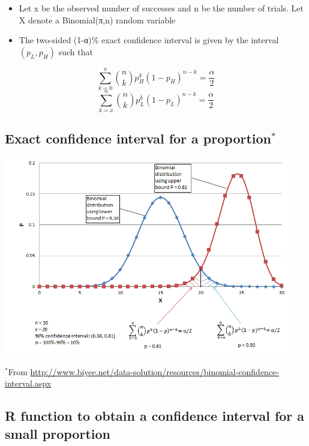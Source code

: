 \documentclass[
]{book}
\providecommand{\tightlist}{%
  \setlength{\itemsep}{0pt}\setlength{\parskip}{0pt}}
\begin{document}
\begin{itemize}
\tightlist
\item
  Let x be the observed number of successes and n be the number of trials. Let X denote a Binomial(π,n) random variable
\item
  The two-sided (1-α)\% exact confidence interval is given by the interval \((p_L, p_H)\) such that
\end{itemize}

\[\sum_{k=0}^x{n \choose k}p_H^k(1-p_H)^{n-k}=\frac{\alpha}{2}\]
\[\sum_{k=x}^n{n \choose k}p_L^k(1-p_L)^{n-k}=\frac{\alpha}{2}\]

\hypertarget{exact-confidence-interval-for-a-proportion-1}{%
\subsection{\texorpdfstring{Exact confidence interval for a proportion\(^*\)}{Exact confidence interval for a proportion\^{}*}}\label{exact-confidence-interval-for-a-proportion-1}}

\includegraphics[width=1\linewidth]{./7_26}

\(^*\)From \url{http://www.biyee.net/data-solution/resources/binomial-confidence-interval.aspx}

\hypertarget{r-function-to-obtain-a-confidence-interval-for-a-small-proportion}{%
\subsection{R function to obtain a confidence interval for a small proportion}\label{r-function-to-obtain-a-confidence-interval-for-a-small-proportion}}
\end{document}
